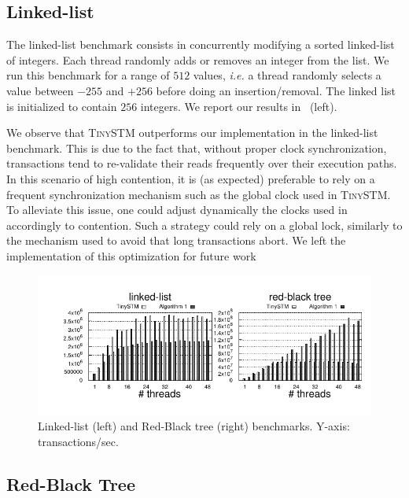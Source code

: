 \subsection{Linked-list}

The linked-list benchmark consists in concurrently modifying a sorted linked-list of integers. 
Each thread randomly adds or removes an integer from the list. 
We run this benchmark for a range of $512$ values, \emph{i.e.} a thread randomly selects a value between $-255$ and $+256$ before doing an insertion/removal.
The linked list is initialized to contain $256$ integers.
We report our results in ~(left).

We observe that \textsc{TinySTM} outperforms our implementation in the linked-list benchmark.
This is due to the fact that, without proper clock synchronization, transactions tend to re-validate their reads frequently over their execution paths.
In this scenario of high contention, it is (as expected) preferable to rely on a frequent synchronization mechanism such as the global clock used in \textsc{TinySTM}.
To alleviate this issue, one could adjust dynamically the clocks used in  accordingly to contention. 
Such a strategy could rely on a global lock, similarly to the mechanism used to avoid that long transactions abort.
We left the implementation of this optimization for future work

\begin{figure}[!t]
  \centering
  \includegraphics[scale = 1.0]{results/intset/ll-rb.pdf}
  \caption{Linked-list (left) and Red-Black tree (right) benchmarks. Y-axis: transactions/sec. }
\end{figure}

\subsection{Red-Black Tree}

